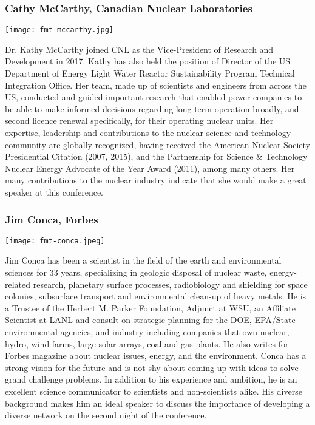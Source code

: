 \subsubsection{Cathy McCarthy, Canadian Nuclear Laboratories}
\begin{minipage}{0.25\textwidth}
	\centering
	\texttt{[image: fmt-mccarthy.jpg]}
\end{minipage}
\begin{minipage}{0.73\textwidth}
	Dr. Kathy McCarthy joined CNL as the Vice-President of Research and Development in 2017. Kathy has also held the position of Director of the US Department of Energy Light Water Reactor Sustainability Program Technical Integration Office. Her team, made up of scientists and engineers from across the US, conducted and guided important research that enabled power companies to be able to make informed decisions regarding long-term operation broadly, and second licence renewal specifically, for their operating nuclear units. Her expertise, leadership and contributions to the nuclear science and technology community are globally recognized, having received the American Nuclear Society Presidential Citation (2007, 2015), and the Partnership for Science \& Technology Nuclear Energy Advocate of the Year Award (2011), among many others. Her many contributions to the nuclear industry indicate that she would make a great speaker at this conference. 
\end{minipage}


\subsubsection{Jim Conca, Forbes}
\begin{minipage}{0.25\textwidth}
	\centering
	\texttt{[image: fmt-conca.jpeg]}
\end{minipage}
\begin{minipage}{0.73\textwidth}
	Jim Conca has been a scientist in the field of the earth and environmental sciences for 33 years, specializing in geologic disposal of nuclear waste, energy-related research, planetary surface processes, radiobiology and shielding for space colonies, subsurface transport and environmental clean-up of heavy metals. He is a Trustee of the Herbert M. Parker Foundation, Adjunct at WSU, an Affiliate Scientist at LANL and consult on strategic planning for the DOE, EPA/State environmental agencies, and industry including companies that own nuclear, hydro, wind farms, large solar arrays, coal and gas plants. He also writes for Forbes magazine about nuclear issues, energy, and the environment. Conca has a strong vision for the future and is not shy about coming up with ideas to solve grand challenge problems. In addition to his experience and ambition, he is an excellent science communicator to scientists and non-scientists alike. His diverse background makes him an ideal speaker to discuss the importance of developing a diverse network on the second night of the conference.
\end{minipage}


